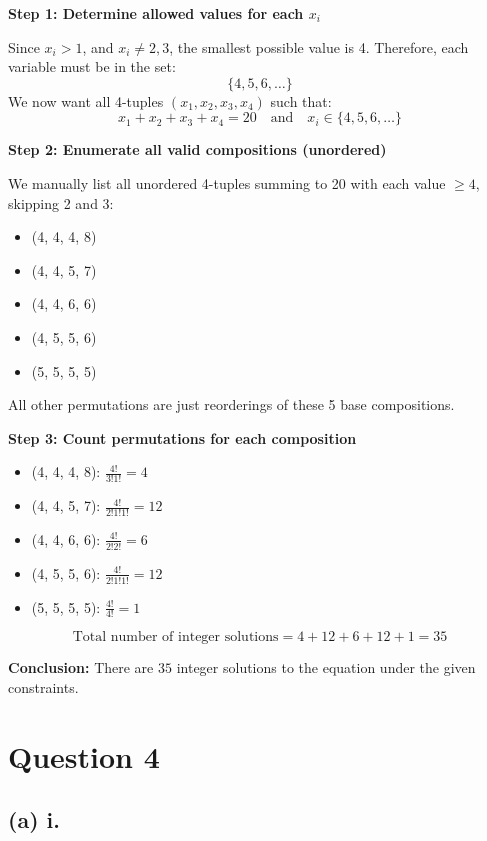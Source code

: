 \documentclass{article}
\begin{document}
\textbf{Step 1: Determine allowed values for each \(x_i\)}

Since \(x_i > 1\), and \(x_i \ne 2,3\), the smallest possible value is 4.  
Therefore, each variable must be in the set:
\[
\{4,5,6,\dots\}
\]
We now want all 4-tuples \((x_1,x_2,x_3,x_4)\) such that:
\[
x_1 + x_2 + x_3 + x_4 = 20 \quad \text{and} \quad x_i \in \{4,5,6,\dots\}
\]

\textbf{Step 2: Enumerate all valid compositions (unordered)}

We manually list all unordered 4-tuples summing to 20 with each value \(\geq 4\), skipping 2 and 3:

\begin{itemize}
  \item (4, 4, 4, 8)
  \item (4, 4, 5, 7)
  \item (4, 4, 6, 6)
  \item (4, 5, 5, 6)
  \item (5, 5, 5, 5)
\end{itemize}

All other permutations are just reorderings of these 5 base compositions.

\textbf{Step 3: Count permutations for each composition}

\begin{itemize}
  \item (4, 4, 4, 8): \(\frac{4!}{3!1!} = 4\)
  \item (4, 4, 5, 7): \(\frac{4!}{2!1!1!} = 12\)
  \item (4, 4, 6, 6): \(\frac{4!}{2!2!} = 6\)
  \item (4, 5, 5, 6): \(\frac{4!}{2!1!1!} = 12\)
  \item (5, 5, 5, 5): \(\frac{4!}{4!} = 1\)
\end{itemize}

\[
\text{Total number of integer solutions} = 4 + 12 + 6 + 12 + 1 = \boxed{35}
\]

\textbf{Conclusion:}  
There are \(\boxed{35}\) integer solutions to the equation under the given constraints.

\section*{Question 4}

\subsection*{(a) i.}
\end{document}
